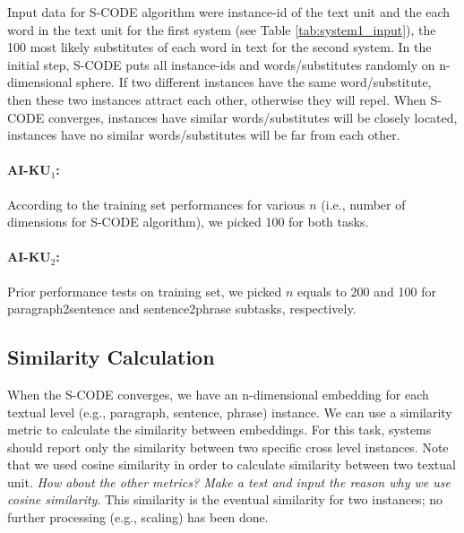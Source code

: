 \documentclass[11pt]{article}
\begin{document}
Input data for S-CODE algorithm were instance-id of the text unit and the each word in the text unit for the first system (see Table \ref{tab:system1_input}), the 100 most likely substitutes of each word in text for the second system. In the initial step, S-CODE puts all instance-ids and words/substitutes randomly on n-dimensional sphere. If two different instances have the same word/substitute, then these two instances attract each other, otherwise they will repel. When S-CODE converges, instances have similar words/substitutes will be closely located, instances have no similar words/substitutes will be far from each other. 

\paragraph{AI-KU$_1$:} According to the training set performances for various $n$ (i.e., number of dimensions for S-CODE algorithm), we picked 100 for both tasks.

\paragraph{AI-KU$_2$:} Prior performance tests on training set, we picked $n$ equals to 200 and 100 for paragraph2sentence and sentence2phrase subtasks, respectively.

\subsection{Similarity Calculation}

When the S-CODE converges, we have an n-dimensional embedding for each textual level (e.g., paragraph, sentence, phrase) instance. We can use a similarity metric to calculate 
the similarity between embeddings. For this task, systems should report only the similarity between two specific cross level instances. Note that we used cosine similarity in order to calculate similarity between two textual unit. \emph{How about the other metrics? Make a test and input the reason why we use cosine similarity}. This similarity is the eventual similarity for two instances; no further processing (e.g., scaling) has been done.
\end{document}
